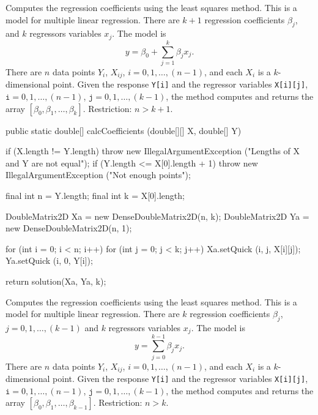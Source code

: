 \begin{tabb} Computes the regression coefficients using the
least squares method. This is a model for multiple linear regression.
There are $k+1$ regression coefficients $\beta_j$, and
$k$ regressors variables $x_j$. The model is
\[
   y = \beta_0 + \sum_{j=1}^k \beta_j x_j.
\]
There are $n$ data points $Y_i$, $X_{ij}$, $i=0,1,\ldots,(n-1)$, and each
$X_{i}$ is a $k$-dimensional point.
Given the response \texttt{Y[i]} and the regressor variables \texttt{X[i][j]},
$\texttt{i} =0,1,\ldots,(n-1)$, $\texttt{j} =0,1,\ldots,(k-1)$, the method
computes and returns the array $[\beta_0, \beta_1, \ldots, \beta_k]$.
Restriction: $n > k+1$.
\end{tabb}
\begin{htmlonly}
\end{htmlonly}
\begin{code}


   public static double[] calcCoefficients (double[][] X, double[] Y)\begin{hide} {
      if (X.length != Y.length)
         throw new IllegalArgumentException ("Lengths of X and Y are not equal");
      if (Y.length <= X[0].length + 1)
         throw new IllegalArgumentException ("Not enough points");

      final int n = Y.length;
      final int k = X[0].length;

      DoubleMatrix2D Xa = new DenseDoubleMatrix2D(n, k);
      DoubleMatrix2D Ya = new DenseDoubleMatrix2D(n, 1);

      for (int i = 0; i < n; i++) {
         for (int j = 0; j < k; j++) {
            Xa.setQuick (i, j, X[i][j]);
         }
         Ya.setQuick (i, 0, Y[i]);
      }

      return solution(Xa, Ya, k);
   }\end{hide}
\end{code}
\begin{tabb} Computes the regression coefficients using the
least squares method. This is a model for multiple linear regression.
There are $k$ regression coefficients $\beta_j$, $j=0,1,\ldots,(k-1)$ and
$k$ regressors variables $x_j$. The model is
\[
   y = \sum_{j=0}^{k-1} \beta_j x_j.
\]
There are $n$ data points $Y_i$, $X_{ij}$, $i=0,1,\ldots,(n-1)$, and each
$X_{i}$ is a $k$-dimensional point.
Given the response \texttt{Y[i]} and the regressor variables \texttt{X[i][j]},
$\texttt{i} =0,1,\ldots,(n-1)$, $\texttt{j} =0,1,\ldots,(k-1)$, the method
computes and returns the array $[\beta_0, \beta_1, \ldots, \beta_{k-1}]$.
Restriction: $n > k$.
\end{tabb}
\begin{htmlonly}
\end{htmlonly}

\begin{code}
\begin{hide}
}\end{hide}
\end{code}

